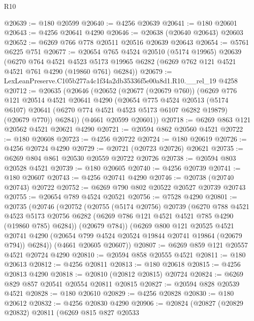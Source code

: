 \begin{lexlean}{R10}
\begin{coremodule}
@20639 := @180 @20599
@20640 := @4256 @20639
@20641 := @180 @20601
@20643 := @4256 @20641 @4290
@20646 := @20638 (@20640 @20643) @20603
@20652 := @6269 @766 @778 @20511 @20516 @20639 @20643
@20654 := @5761 @6225 @751
@20677 := @20654
    @765
    @4524
    @20510
    (@5174 @19965)
    @20639
    (@6270
      @764
      @4521
      @4523
      @5173
      @19965
      @6282
      (@6269 @762 @121 @4521 @4521 @761 @4290 (@19860 @761) @6284))
@20679 := LexLeanPreserve.C105b277a4c1f34a2db35336f5e00a8d1.R10.__rel_19 @4258
@20712 := @20635
    (@20646
      (@20652
        (@20677 (@20679 @760))
        (@6269
          @776
          @121
          @20514
          @4521
          @20641
          @4290
          (@20654
            @775
            @4524
            @20513
            (@5174 @6107)
            @20641
            (@6270 @774 @4521 @4523 @5173 @6107 @6282 @19879)
            (@20679 @770))
          @6284))
      (@4661 @20599 @20601))
@20718 := @6269 @863 @121 @20562 @4521 @20621 @4290
@20721 := @20594 @862 @20560 @4521
@20722 := @180 @20608
@20723 := @4256 @20722
@20724 := @180 @20619
@20726 := @4256 @20724 @4290
@20729 := @20721 (@20723 @20726) @20621
@20735 := @6269 @804 @861 @20530 @20559 @20722 @20726
@20738 := @20594 @803 @20528 @4521
@20739 := @180 @20605
@20740 := @4256 @20739
@20741 := @180 @20607
@20743 := @4256 @20741 @4290
@20746 := @20738 (@20740 @20743) @20722
@20752 := @6269 @790 @802 @20522 @20527 @20739 @20743
@20755 := @20654 @789 @4524 @20521
@20756 := @7528 @4290
@20801 := @20735
    (@20746
      (@20752
        (@20755
          (@5174 @20756)
          @20739
          (@6270
            @788
            @4521
            @4523
            @5173
            @20756
            @6282
            (@6269 @786 @121 @4521 @4521 @785 @4290 (@19860 @785) @6284))
          (@20679 @784))
        (@6269
          @800
          @121
          @20525
          @4521
          @20741
          @4290
          (@20654 @799 @4524 @20524 @19844 @20741 @19864 (@20679 @794))
          @6284))
      (@4661 @20605 @20607))
@20807 := @6269 @859 @121 @20557 @4521 @20724 @4290
@20810 := @20594 @858 @20555 @4521
@20811 := @180 @20613
@20812 := @4256 @20811
@20813 := @180 @20618
@20815 := @4256 @20813 @4290
@20818 := @20810 (@20812 @20815) @20724
@20824 := @6269 @829 @857 @20541 @20554 @20811 @20815
@20827 := @20594 @828 @20539 @4521
@20828 := @180 @20610
@20829 := @4256 @20828
@20830 := @180 @20612
@20832 := @4256 @20830 @4290
@20906 := @20824
    (@20827
      (@20829 @20832)
      @20811
      (@6269
        @815
        @827
        @20533

\end{coremodule}
\end{lexlean}
